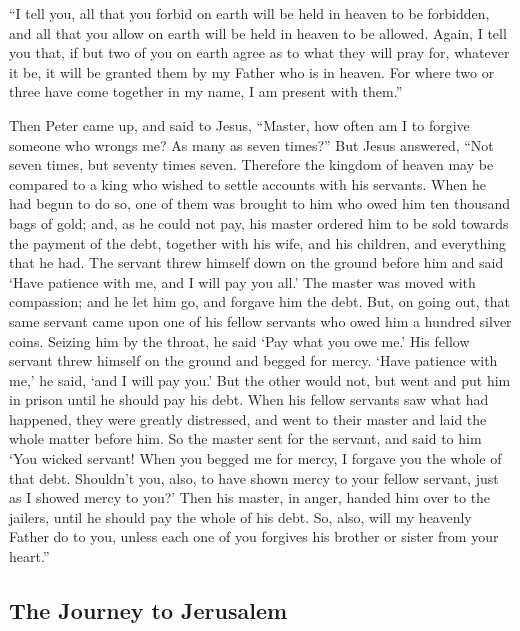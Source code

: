  ``I tell you, all that you forbid on earth will be held in
heaven to be forbidden, and all that you allow on earth will be held in
heaven to be allowed.  Again, I tell you that, if but two
of you on earth agree as to what they will pray for, whatever it be, it
will be granted them by my Father who is in heaven.  For
where two or three have come together in my name, I am present with
them.''

 Then Peter came up, and said to Jesus, ``Master, how often
am I to forgive someone who wrongs me? As many as seven times?''
 But Jesus answered, ``Not seven times, but seventy times
seven.  Therefore the kingdom of heaven may be compared to
a king who wished to settle accounts with his servants. 
When he had begun to do so, one of them was brought to him who owed him
ten thousand bags of gold;  and, as he could not pay, his
master ordered him to be sold towards the payment of the debt, together
with his wife, and his children, and everything that he had.
 The servant threw himself down on the ground before him
and said `Have patience with me, and I will pay you all.' 
The master was moved with compassion; and he let him go, and forgave him
the debt.  But, on going out, that same servant came upon
one of his fellow servants who owed him a hundred silver coins. Seizing
him by the throat, he said `Pay what you owe me.'  His
fellow servant threw himself on the ground and begged for mercy. `Have
patience with me,' he said, `and I will pay you.'  But the
other would not, but went and put him in prison until he should pay his
debt.  When his fellow servants saw what had happened, they
were greatly distressed, and went to their master and laid the whole
matter before him.  So the master sent for the servant, and
said to him `You wicked servant! When you begged me for mercy, I forgave
you the whole of that debt.  Shouldn't you, also, to have
shown mercy to your fellow servant, just as I showed mercy to you?'
 Then his master, in anger, handed him over to the jailers,
until he should pay the whole of his debt.  So, also, will
my heavenly Father do to you, unless each one of you forgives his
brother or sister from your heart.''

\hypertarget{the-journey-to-jerusalem}{%
\subsection{The Journey to Jerusalem}\label{the-journey-to-jerusalem}}


